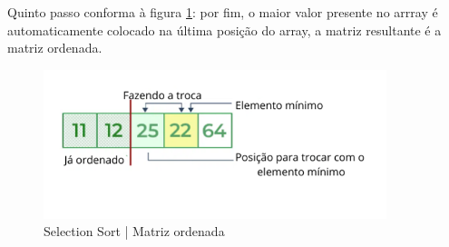 \par Quinto passo conforma à figura \ref{fig:exemplo5}: por fim, o maior valor presente no arrray é automaticamente colocado na última posição do array, a matriz resultante é a matriz ordenada.

\begin{figure}[h!]
    \centering
    \includegraphics[width = 10cm]{Imagens/Selection Sort/image1.png}
    \caption{Selection Sort | Matriz ordenada}
    \label{fig:exemplo5}
\end{figure}